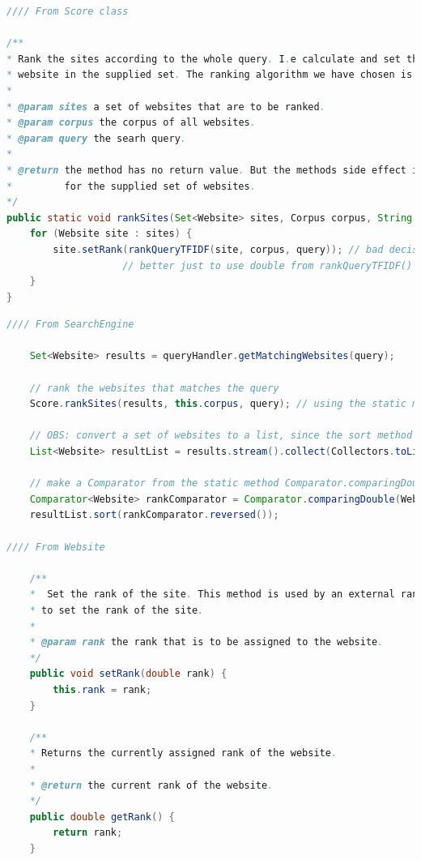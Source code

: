 \begin{lstlisting}[language=Java, caption=This is a code example., label=lst:ScoreUtilityClass]
//// From Score class 

/**
* Rank the sites according to the whole query. I.e calculate and set the rank field of each
* website in the supplied set. The ranking algorithm we have chosen is TFIDF.
* 
* @param sites a set of websites that are to be ranked.
* @param corpus the corpus of all websites.
* @param query the searh query.
* 
* @return the method has no return value. But the methods side effect is to set the rank field
*         for the supplied set of websites.
*/
public static void rankSites(Set<Website> sites, Corpus corpus, String query) {
	for (Website site : sites) {
		site.setRank(rankQueryTFIDF(site, corpus, query)); // bad decision! 
					// better just to use double from rankQueryTFIDF() and do the sorting imidiately. 
	}
}
\end{lstlisting}

\begin{lstlisting}[language=Java, caption=This is a code example., label=lst:ScoreUtilityClass-2]
//// From SearchEngine 

	Set<Website> results = queryHandler.getMatchingWebsites(query);
	
	// rank the websites that matches the query
	Score.rankSites(results, this.corpus, query); // using the static method Score.rankSites.
	
	// OBS: convert a set of websites to a list, since the sort method only works for list.
	List<Website> resultList = results.stream().collect(Collectors.toList());  
	
	// make a Comparator from the static method Comparator.comparingDouble()
	Comparator<Website> rankComparator = Comparator.comparingDouble(Website::getRank);
	resultList.sort(rankComparator.reversed()); 

//// From Website

	/**
	*  Set the rank of the site. This method is used by an external ranking method
	* to set the rank of the site. 
	* 
	* @param rank the rank that is to be assigned to the website.  
	*/
	public void setRank(double rank) {
		this.rank = rank;
	}

	/**
	* Returns the currently assigned rank of the website. 
	* 
	* @return the current rank of the website. 
	*/
	public double getRank() {
		return rank;
	}
\end{lstlisting}


